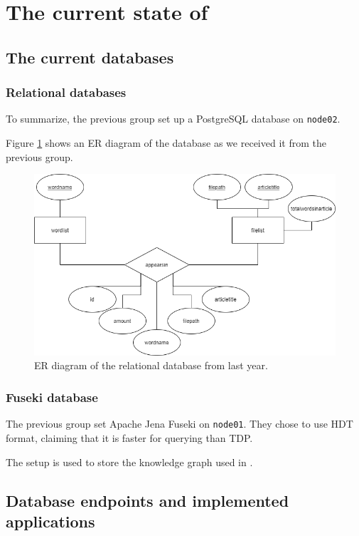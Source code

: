\section{The current state of \knox{}}


\subsection{The current \knox{} databases}
\subsubsection*{Relational databases}
To summarize, the previous group set up a PostgreSQL database on \texttt{node02}.

Figure \ref{olddatabase} shows an ER diagram of the database as we received it from the previous group.

\begin{figure}[h]
    \centering
    \includegraphics[width=\linewidth]{Images/old_db_er_diagram.png}
    \caption{ER diagram of the relational database from last year.}
    \label{olddatabase}
\end{figure}

\subsubsection*{Fuseki database}
The previous group set Apache Jena Fuseki on \texttt{node01}. They chose to use HDT format, claiming that it is faster for querying than TDP\cite{knox2020}.

The setup is used to store the knowledge graph used in \knox{}.

\subsection{Database endpoints and implemented applications}

